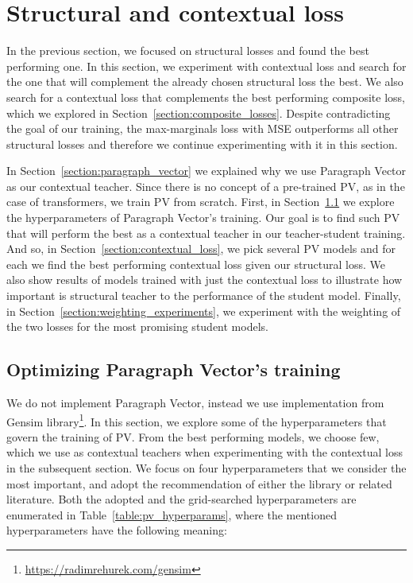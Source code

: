 \section{Structural and contextual loss}\label{section:improving_both}

In the previous section, we focused on structural losses and found the best
performing one. In this section, we experiment with contextual loss and search
for the one that will complement the already chosen structural loss the best.
We also search for a contextual loss that complements the best performing
composite loss, which we explored in Section~\ref{section:composite_losses}.
Despite contradicting the goal of our training, the max-marginals loss with MSE
outperforms all other structural losses and therefore we continue experimenting
with it in this section.

In Section~\ref{section:paragraph_vector} we explained why we use Paragraph
Vector \citep{le2014distributed} as our contextual teacher. Since there is no
concept of a pre-trained PV, as in the case of transformers, we train PV from
scratch. First, in Section~\ref{section:pv_training} we explore the
hyperparameters of Paragraph Vector's training. Our goal is to find such PV
that will perform the best as a contextual teacher in our teacher-student
training. And so, in Section~\ref{section:contextual_loss}, we pick several PV
models and for each we find the best performing contextual loss given our
structural loss. We also show results of models trained with just the
contextual loss to illustrate how important is structural teacher to the
performance of the student model. Finally, in
Section~\ref{section:weighting_experiments}, we experiment with the weighting
of the two losses for the most promising student models.

\subsection{Optimizing Paragraph Vector's training}\label{section:pv_training}

We do not implement Paragraph Vector, instead we use implementation from Gensim
library\footnote{\label{fn:link_to_gensim}\url{https://radimrehurek.com/gensim}}.
In this section, we explore some of the hyperparameters that govern the
training of PV. From the best performing models, we choose few, which we use as
contextual teachers when experimenting with the contextual loss in the
subsequent section. We focus on four hyperparameters that we consider the most
important, and adopt the recommendation of either the library or related
literature. Both the adopted and the grid-searched hyperparameters are
enumerated in Table~\ref{table:pv_hyperparams}, where the mentioned
hyperparameters have the following meaning:


